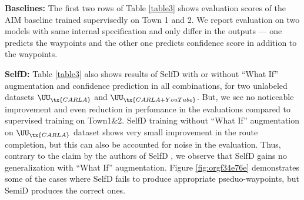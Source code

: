 \documentclass[letterpaper, 12pt]{book}
\theoremstyle{definition}
\theoremstyle{definition}
\theoremstyle{definition}
\theoremstyle{definition}
\theoremstyle{definition}
\begin{document}
\textbf{Baselines:} The first two rows of Table \ref{table3} shows evaluation scores of the AIM
baseline trained supervisedly on Town 1 and 2. We report evaluation on two
models with same internal specification and only differ in the outputs --- one
predicts the waypoints and the other one predicts confidence score in addition
to the waypoints.

\textbf{SelfD:} Table \ref{table3} also shows results of SelfD with or without ``What If''
augmentation and confidence prediction in all combinations, for two unlabeled
datasets \(\UU_{\tx{CARLA}}\) and \(\UU_{\tx{CARLA + YouTube}}\). But, we see no
noticeable improvement and even reduction in perfomance in the evaluations
compared to supervised training on Town1\&2. SelfD training without ``What If''
augmentation on \(\UU_{\tx{CARLA}}\) dataset shows very small improvement in the
route completion, but this can also be accounted for noise in the
evaluation. Thus, contrary to the claim by the authors of SelfD
\cite{Zhang2022a}, we observe that SelfD gains no generalization with ``What
If'' augmentation. Figure \ref{fig:orgf34e76e} demonstrates some of the cases where
SelfD fails to produce appropriate pseduo-waypoints, but SemiD produces the
correct ones.
\end{document}
